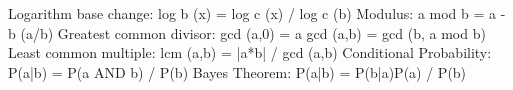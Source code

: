 \message{ !name(math.tex)}\documentclass{article}
\begin{document}

Logarithm base change:
log b (x) = log c (x) / log c (b)
Modulus:
a mod b = a - b (a/b)
Greatest common divisor:
gcd (a,0) = a
gcd (a,b) = gcd (b, a mod b)
Least common multiple:
lcm (a,b) = |a*b| / gcd (a,b)
Conditional Probability:
P(a|b) = P(a AND b) / P(b)
Bayes Theorem:
P(a|b) = P(b|a)P(a) / P(b)
\end{document}
